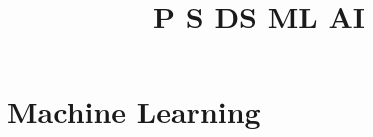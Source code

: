 \documentclass[]{book}
\title{P S DS ML AI}
\author{}
\begin{document}
\maketitle
\tableofcontents
{\Huge \chapter{Machine Learning}}

\end{document}

